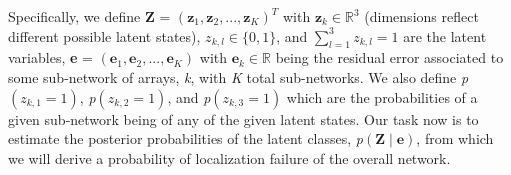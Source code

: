 \documentclass{article}
\begin{document}
Specifically, we define \textbf{Z} = $\left(\textbf{z$_1$},\textbf{z$_2$},...,\textbf{z$_K$}\right)^T$ with $\textbf{z$_\textit{k}$} \in \mathbb{R}^3$ (dimensions reflect different possible latent states), $\textit{z}_{k,l} \in \{0,1\}$, and $\sum^3_{l=1}\textit{z}_{k,l} = 1$ are the latent variables, \textbf{e} = $\left(\textbf{e$_1$},\textbf{e$_2$},...,\textbf{e$_K$} \right)$ with $\textbf{e$_\textit{k}$} \in \mathbb{R}$ being the residual error associated to some sub-network of arrays, \textit{k}, with \textit{K} total sub-networks. We also define \textit{p}$\left(\textit{z$_{k,1}$} = 1\right)$, \textit{p}$\left(\textit{z$_{k,2}$} = 1\right)$, and \textit{p}$\left(\textit{z$_{k,3}$} = 1\right)$ which are the probabilities of a given sub-network being of any of the given latent states. Our task now is to estimate the posterior probabilities of the latent classes, \textit{p}$\left(\textbf{Z}\mid\textbf{e}\right)$, from which we will derive a probability of localization failure of the overall network.
\end{document}
